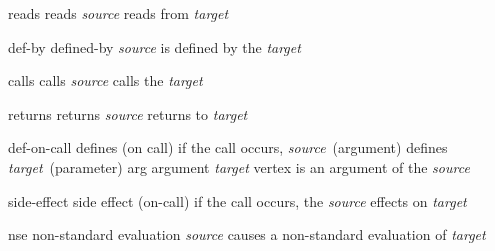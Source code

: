 \def\DefineEdgeType#1#2#3{%
   \expandafter\def\csname edge#1short\endcsname{#1}
   \expandafter\def\csname edge#1long\endcsname{#2}
   \expandafter\def\csname edge#1desc\endcsname{\def\s{\textit{source}\xspace}\def\t{\textit{target}\xspace}#3}
}
\usepackage{xspace}
\def\GetEdge#1#2{\csname edge#1#2\endcsname}
\def\edge#1{\hyperlink{e:#1}{\textsf{\GetEdge{#1}{short}}}}
\def\E#1{\textit{\edge{#1}}}
\def\V#1{\hyperlink{v:#1}{\textsf{\textit{#1}}}}
\DefineEdgeType{reads}{reads}{\s reads from \t}
\DefineEdgeType{def-by}{defined-by}{\s is defined by the \t}
\DefineEdgeType{calls}{calls}{\s calls the \t}
\DefineEdgeType{returns}{returns}{\s returns to \t}
\DefineEdgeType{def-on-call}{defines (on call)}{if the call occurs, \s~(argument) defines \t~(parameter)} %
\DefineEdgeType{arg}{argument}{\t vertex is an argument of the \s}
\DefineEdgeType{side-effect}{side effect (on-call)}{if the call occurs, the \s effects on \t}
\DefineEdgeType{nse}{non-standard evaluation}{\s causes a non-standard evaluation of \t}
\def\LeftArrow{\text{\BeginAccSupp{method=escape,ActualText={<-}}\(\leftarrow\)\EndAccSupp{}}}
\def\RightArrow{\text{\BeginAccSupp{method=escape,ActualText={->}}\(\rightarrow\)\EndAccSupp{}}}
\def\DoubleLeftArrow{\text{\BeginAccSupp{method=escape,ActualText={<<-}}\(\twoheadleftarrow\)\EndAccSupp{}}}
\def\DoubleRightArrow{\text{\BeginAccSupp{method=escape,ActualText={->>}}\(\twoheadrightarrow\)\EndAccSupp{}}}
\AtBeginDocument{\xlstInlinePreBreak{}\xlstPreBreak{}}
\RequirePackage{tabularx}
%
\usepackage{multicol}
\usepackage{xfp}
\usepackage{multirow}
\def\PrintResultOfThe#1#2#3#4{%
   \edef\result{\fpeval{round(#1,#2)}}%
   \edef\chk{\fpeval{\result=0?1:0}}%
   \ifnum\chk=1\relax
      \edef\numcmpres{\fpeval{1/(10^#2)}}%
      \qty{< \numcmpres}{#4}%
   \else
      #3\relax
   \fi
}
\newcommand*\ThePercent[3][2]{%
   \edef\fst{\fpeval{#2}}%
   \edef\snd{\fpeval{#3}}%
   \edef\result{\fpeval{\fst/\snd * 100}}%
   \PrintResultOfThe{\result}{#1}{\ifdim\result sp=100sp\relax\ifdim\fst sp=\snd sp\else\(\approx\)\fi\fi\qty{\fpeval{\result}}{\percent}}{\percent}%
}
\def\FAIR{\textsc{fair}\xspace}
\usepackage[subtle]{savetrees}
